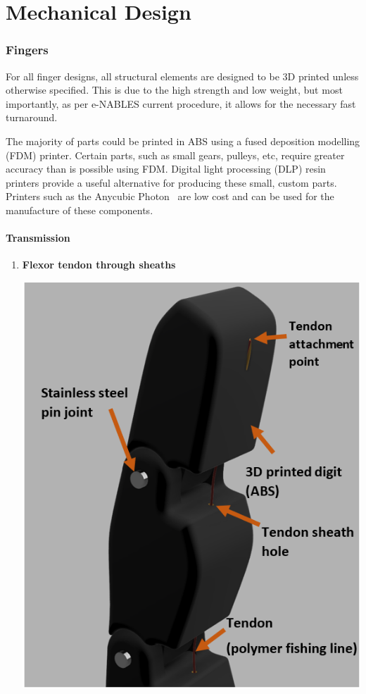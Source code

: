 \documentclass[11pt,3p]{report}
\begin{document}
\part{Mechanical Design}
\begin{multicols}{2}

	\section{Fingers}
For all finger designs, all structural elements are designed to be 3D printed unless otherwise specified. This is due to the high strength and low weight, but most importantly, as per e-NABLES current procedure, it allows for the necessary fast turnaround.

The majority of parts could be printed in ABS using a fused deposition modelling (FDM) printer. Certain parts, such as small gears, pulleys, etc, require greater accuracy than is possible using FDM. Digital light processing (DLP) resin printers provide a useful alternative for producing these small, custom parts. Printers such as the Anycubic Photon~\cite{photon} are low cost and can be used for the manufacture of these components.
	
		\subsection{Transmission}
		
		
			\begin{enumerate}[noitemsep]
			\item \textbf{Flexor tendon through sheaths} {

\includegraphics[scale=0.5]{tendon.PNG}
			
}
\end{enumerate}
\end{multicols}
\end{document}
